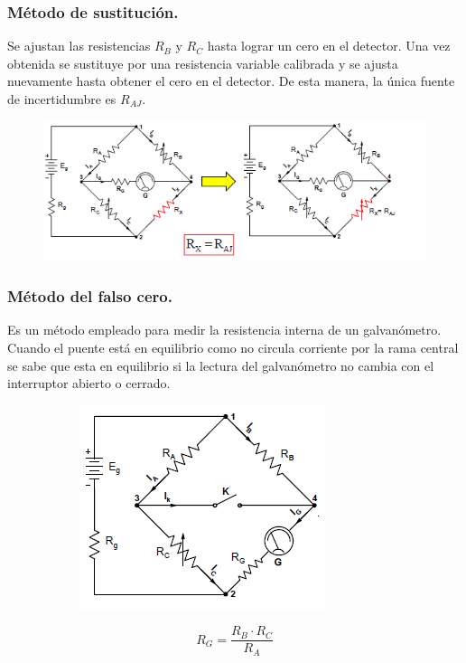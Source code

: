 \subsubsection{Método de sustitución.}
Se ajustan las resistencias $R_B$ y $R_C$ hasta lograr un cero en el detector. Una vez obtenida se sustituye por una resistencia variable calibrada y se ajusta nuevamente hasta obtener el cero en el detector. De esta manera, la única fuente de incertidumbre es $R_{AJ}$.

\begin{figure}[H]
	\centering
	\includegraphics[width=0.7\linewidth]{ImagenesTema4/13}
	\label{fig:13}
\end{figure}



\subsubsection{Método del falso cero.}
Es un método empleado para medir la resistencia interna de un galvanómetro. Cuando el puente está en equilibrio como no circula corriente por la rama central se sabe que esta en equilibrio si la lectura del galvanómetro no cambia con el interruptor abierto o cerrado.
\begin{figure}[H]
	\begin{minipage}{0.5\textwidth}
		\begin{figure}[H]
			\centering
			\includegraphics[width=0.7\linewidth]{ImagenesTema4/15}
			\label{fig:9}
		\end{figure}\textbf{}	
	\end{minipage}
	\begin{minipage}{0.5\textwidth}
		\[R_G=\frac{R_B\cdot R_C}{R_A}\]
	\end{minipage}
\end{figure}

